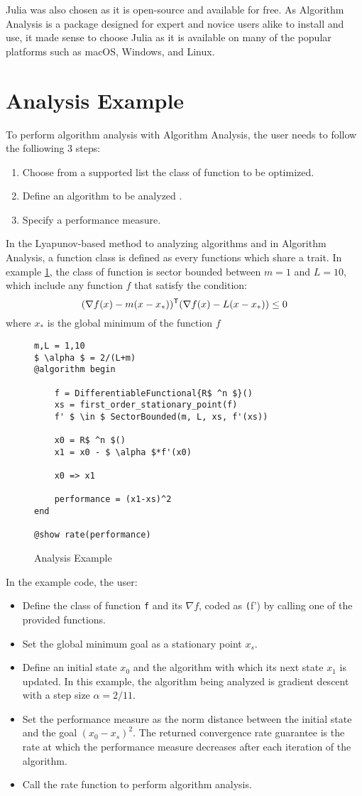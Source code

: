 Julia was also chosen as it is open-source and available for free. As Algorithm Analysis is a package designed for expert and novice users alike to install and use, it made sense to choose Julia as it is available on many of the popular platforms such as macOS, Windows, and Linux.

\section{Analysis Example}
To perform algorithm analysis with Algorithm Analysis, the user needs to follow the folliowing 3 steps:
\begin{enumerate}
	\item Choose from a supported list the class of function to be optimized.
	\item Define an algorithm to be analyzed .
	\item Specify a performance measure.
\end{enumerate}
In the Lyapunov-based method to analyzing algorithms and in Algorithm Analysis, a function class is defined as every functions which share a trait. In example \ref{ex_analysis}, the class of function is sector bounded between $m=1$ and $L=10$, which include any function $f$ that satisfy the condition:
\begin{equation}
  (\nabla f(x) - m(x-x_*))^{\mathsf{T}} (\nabla f(x) - L(x-x_*)) \leq 0
\end{equation}
where $x_*$ is the global minimum of the function $f$
\begin{figure}[h!]
	\begin{lstlisting}[mathescape]
m,L = 1,10
$ \alpha $ = 2/(L+m)
@algorithm begin

	f = DifferentiableFunctional{R$ ^n $}()
	xs = first_order_stationary_point(f)
	f' $ \in $ SectorBounded(m, L, xs, f'(xs))

	x0 = R$ ^n $()
	x1 = x0 - $ \alpha $*f'(x0)

	x0 => x1

	performance = (x1-xs)^2
end

@show rate(performance)
\end{lstlisting}
\caption{Analysis Example}
\label{ex_analysis}
\end{figure} In the example code, the user:
\begin{itemize}
	\item Define the class of function \texttt{f} and its $\nabla f$, coded as \texttt(f') by calling one of the provided functions.
	\item Set the global minimum goal as a stationary point $ x_s $.
	\item Define an initial state $ x_0 $ and the algorithm with which its next state $ x_1$ is updated. In this example, the algorithm being analyzed is gradient descent with a step size $ \alpha = 2/11$.
	\item Set the performance measure as the norm distance between the initial state and the goal $ (x_0 - x_s)^2 $. The returned convergence rate guarantee is the rate at which the performance measure decreases after each iteration of the algorithm.
	\item Call the rate function to perform algorithm analysis.
\end{itemize}

